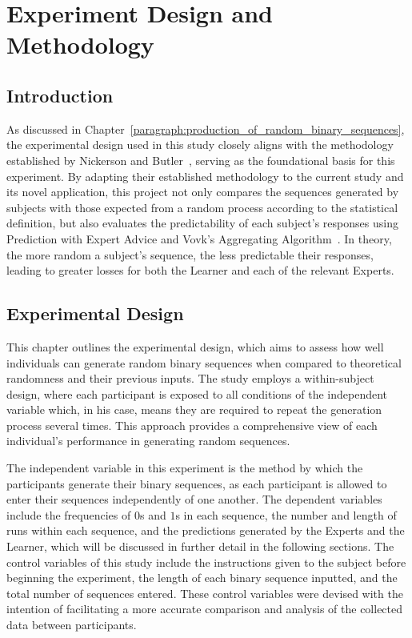 \section{Experiment Design and Methodology}\label{section:experiment_design_and_methodology}
\subsection{Introduction}\label{subsection:introduction}
As discussed in Chapter~\ref{paragraph:production_of_random_binary_sequences}, the experimental design used in this study closely aligns with the methodology established by Nickerson and Butler~\cite{nickerson:2009}, serving as the foundational basis for this experiment. By adapting their established methodology to the current study and its novel application, this project not only compares the sequences generated by subjects with those expected from a random process according to the statistical definition, but also evaluates the predictability of each subject's responses using Prediction with Expert Advice and Vovk's Aggregating Algorithm~\cite{vovk:1990}. In theory, the more random a subject's sequence, the less predictable their responses, leading to greater losses for both the Learner and each of the relevant Experts.

\subsection{Experimental Design}\label{subsection:experimental_design}
This chapter outlines the experimental design, which aims to assess how well individuals can generate random binary sequences when compared to theoretical randomness and their previous inputs. The study employs a within-subject design, where each participant is exposed to all conditions of the independent variable which, in his case, means they are required to repeat the generation process several times. This approach provides a comprehensive view of each individual's performance in generating random sequences.

The independent variable in this experiment is the method by which the participants generate their binary sequences, as each participant is allowed to enter their sequences independently of one another. The dependent variables include the frequencies of $0$s and $1$s in each sequence, the number and length of runs within each sequence, and the predictions generated by the Experts and the Learner, which will be discussed in further detail in the following sections. The control variables of this study include the instructions given to the subject before beginning the experiment, the length of each binary sequence inputted, and the total number of sequences entered. These control variables were devised with the intention of facilitating a more accurate comparison and analysis of the collected data between participants.

